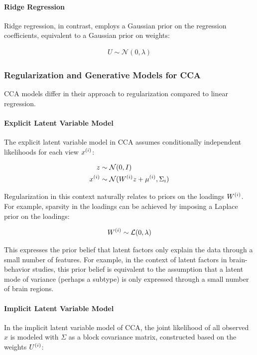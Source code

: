 \paragraph{Ridge Regression}
Ridge regression, in contrast, employs a Gaussian prior on the regression coefficients, equivalent to a Gaussian prior on weights:

\begin{align}
    U \sim \mathcal{N}(0, \lambda)
\end{align}

\subsubsection{Regularization and Generative Models for CCA}
CCA models differ in their approach to regularization compared to linear regression.

\paragraph{Explicit Latent Variable Model}
The explicit latent variable model in CCA assumes conditionally independent likelihoods for each view \(x^{(i)}\):

\begin{align}
    z &\sim \mathcal{N}(0, I) \\
    x^{(i)} &\sim \mathcal{N}(W^{(i)} z + \mu^{(i)}, \Sigma_{i})
\end{align}

Regularization in this context naturally relates to priors on the loadings \(W^{(i)}\).
For example, sparsity in the loadings can be achieved by imposing a Laplace prior on the loadings:

\begin{align}
    W^{(i)} \sim \mathcal{L}(0, \lambda)
\end{align}

This expresses the prior belief that latent factors only explain the data through a small number of features.
For example, in the context of latent factors in brain-behavior studies, this prior belief is equivalent to the assumption that a latent mode of variance (perhaps a subtype) is only expressed through a small number of brain regions.

\paragraph{Implicit Latent Variable Model}
In the implicit latent variable model of CCA, the joint likelihood of all observed \(x\) is modeled with \(\Sigma\) as a block covariance matrix, constructed based on the weights \(U^{(i)}\):

